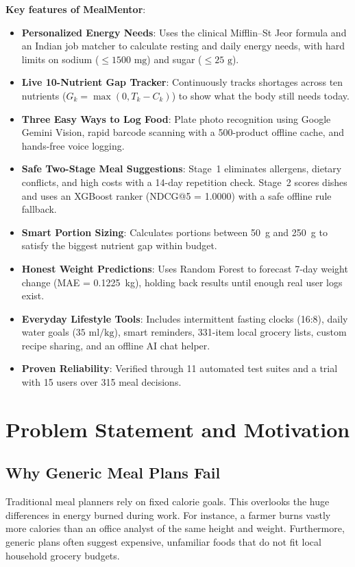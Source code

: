 \documentclass[10pt, conference, letterpaper]{IEEEtran}
\begin{document}
\textbf{Key features of MealMentor}:
\begin{itemize}[leftmargin=*, nosep]
    \item \textbf{Personalized Energy Needs}: Uses the clinical Mifflin--St Jeor formula and an Indian job matcher to calculate resting and daily energy needs, with hard limits on sodium ($\le 1500\text{ mg}$) and sugar ($\le 25\text{ g}$).
    \item \textbf{Live 10-Nutrient Gap Tracker}: Continuously tracks shortages across ten nutrients ($G_k = \max(0, T_k - C_k)$) to show what the body still needs today.
    \item \textbf{Three Easy Ways to Log Food}: Plate photo recognition using Google Gemini Vision, rapid barcode scanning with a 500-product offline cache, and hands-free voice logging.
    \item \textbf{Safe Two-Stage Meal Suggestions}: Stage~1 eliminates allergens, dietary conflicts, and high costs with a 14-day repetition check. Stage~2 scores dishes and uses an XGBoost ranker (NDCG@5 = 1.0000) with a safe offline rule fallback.
    \item \textbf{Smart Portion Sizing}: Calculates portions between 50~g and 250~g to satisfy the biggest nutrient gap within budget.
    \item \textbf{Honest Weight Predictions}: Uses Random Forest to forecast 7-day weight change (MAE = 0.1225~kg), holding back results until enough real user logs exist.
    \item \textbf{Everyday Lifestyle Tools}: Includes intermittent fasting clocks (16:8), daily water goals ($35\text{ ml/kg}$), smart reminders, 331-item local grocery lists, custom recipe sharing, and an offline AI chat helper.
    \item \textbf{Proven Reliability}: Verified through 11 automated test suites and a trial with 15 users over 315 meal decisions.
\end{itemize}

\section{Problem Statement and Motivation}

\subsection{Why Generic Meal Plans Fail}
Traditional meal planners rely on fixed calorie goals. This overlooks the huge differences in energy burned during work. For instance, a farmer burns vastly more calories than an office analyst of the same height and weight. Furthermore, generic plans often suggest expensive, unfamiliar foods that do not fit local household grocery budgets.
\end{document}
